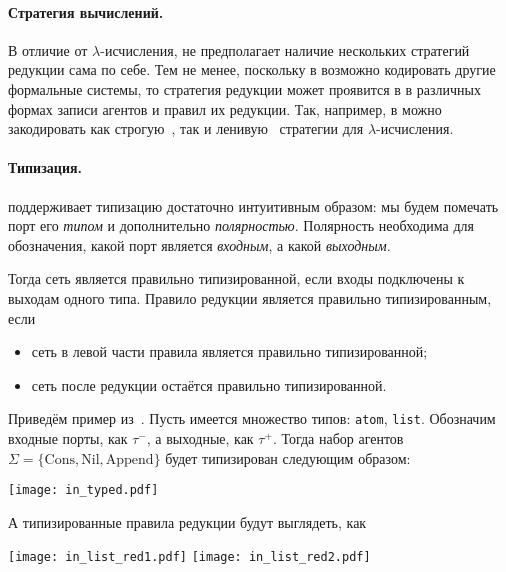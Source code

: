\paragraph{Стратегия вычислений.}

В отличие от $\lambda$-исчисления, \INs{} не предполагает наличие нескольких стратегий редукции сама по себе.
Тем не менее, поскольку в \INs{} возможно кодировать другие формальные системы, то стратегия редукции может проявится в \INs{} в различных формах записи агентов и правил их редукции.
Так, например, в \INs{} можно закодировать как строгую~\cite{sinotCallbyNameCallbyValueTokenPassing2005}, так и ленивую~\cite{sinotTokenPassingNetsCallbyNeed2006} стратегии для $\lambda$-исчисления.

\paragraph{Типизация.}

\INs{} поддерживает типизацию достаточно интуитивным образом: мы будем помечать порт его \textit{типом} и дополнительно \textit{полярностью}.
Полярность необходима для обозначения, какой порт является \textit{входным}, а какой \textit{выходным}.

Тогда сеть является правильно типизированной, если входы подключены к выходам одного типа.
Правило редукции является правильно типизированным, если
\begin{itemize}
    \item сеть в левой части правила является правильно типизированной;
    \item сеть после редукции остаётся правильно типизированной.
\end{itemize}

Приведём пример из~\cite[раздел~2]{lafontInteractionNets1989}.
Пусть имеется множество типов: \texttt{atom}, \texttt{list}.
Обозначим входные порты, как $\tau^{-}$, а выходные, как $\tau^{+}$.
Тогда набор агентов $\Sigma = \{\text{Cons}, \text{Nil}, \text{Append}\}$ будет типизирован следующим образом:
\begin{center}
    \texttt{[image: in\_typed.pdf]}
\end{center}
А типизированные правила редукции будут выглядеть, как
\begin{center}
    \texttt{[image: in\_list\_red1.pdf]}
    \texttt{[image: in\_list\_red2.pdf]}
\end{center}
